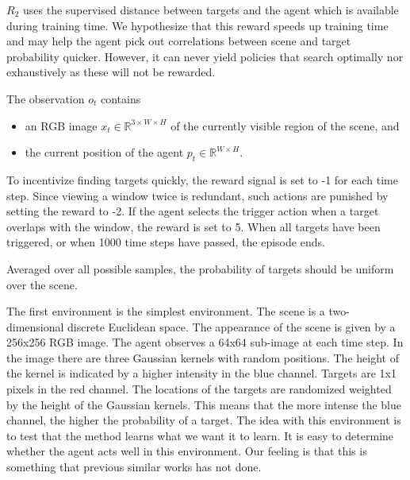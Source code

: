 \(R_2\) uses the supervised distance between targets and the agent which is available during training time. %
We hypothesize that this reward speeds up training time and may help the agent pick out correlations between scene and target probability quicker.
However, it can never yield policies that search optimally nor exhaustively as these will not be rewarded.


The observation \(o_t\) contains

\begin{itemize}
    \item an RGB image \(x_t \in \mathbb{R}^{3 \times W \times H}\) of the currently visible region of the scene, and
    \item the current position of the agent \(p_t \in  \mathbb{R}^{W \times H}\). %
\end{itemize}


To incentivize finding targets quickly, the reward signal is set to -1 for each time step.
Since viewing a window twice is redundant, such actions are punished by setting the reward to -2.
If the agent selects the trigger action when a target overlaps with the window, the reward is set to 5.
When all targets have been triggered, or when 1000 time steps have passed, the episode ends.

Averaged over all possible samples, the probability of targets should be uniform over the scene.

The first environment is the simplest environment. 
The scene is a two-dimensional discrete Euclidean space.
The appearance of the scene is given by a 256x256 RGB image.
The agent observes a 64x64 sub-image at each time step.
In the image there are three Gaussian kernels with random positions.
The height of the kernel is indicated by a higher intensity in the blue channel.
Targets are 1x1 pixels in the red channel.
The locations of the targets are randomized weighted by the height of the Gaussian kernels.
This means that the more intense the blue channel, the higher the probability of a target.
The idea with this environment is to test that the method learns what we want it to learn.
It is easy to determine whether the agent acts well in this environment.
Our feeling is that this is something that previous similar works has not done. %

